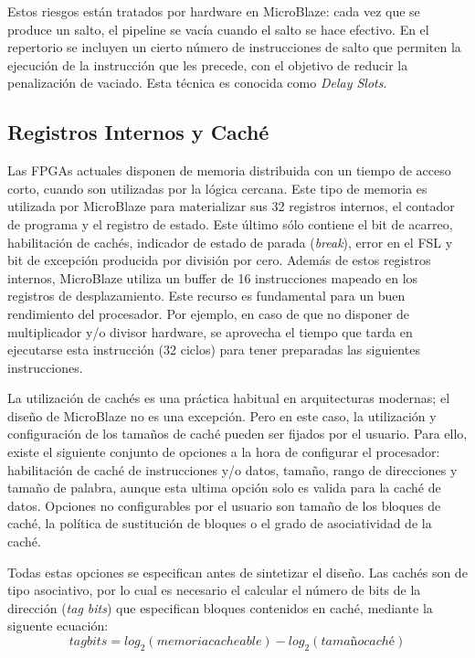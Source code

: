 Estos riesgos están tratados por hardware en MicroBlaze: cada vez que se produce
un salto, el pipeline se vacía cuando el salto se hace efectivo. En el
repertorio se incluyen un cierto número de instrucciones de salto que permiten
la ejecución de la instrucción que les precede, con el objetivo de reducir la
penalización de vaciado. Esta técnica es conocida como \emph{Delay Slots}.

\subsection{Registros Internos y Caché}

Las FPGAs actuales disponen de memoria distribuida con un tiempo de acceso
corto, cuando son utilizadas por la lógica cercana. Este tipo de memoria es
utilizada por MicroBlaze para materializar sus 32 registros internos, el
contador de programa y el registro de estado. Este último sólo contiene el bit
de acarreo, habilitación de cachés, indicador de estado de parada
(\emph{break}), error en el FSL y bit de excepción producida por división por
cero. Además de estos registros internos, MicroBlaze utiliza un buffer de 16
instrucciones mapeado en los registros de desplazamiento. Este recurso es
fundamental para un buen rendimiento del procesador. Por ejemplo, en caso de que
no disponer de multiplicador y/o divisor hardware, se aprovecha el tiempo que
tarda en ejecutarse esta instrucción (32 ciclos) para tener preparadas las
siguientes instrucciones.

La utilización de cachés es una práctica habitual en arquitecturas modernas; el
diseño de MicroBlaze no es una excepción. Pero en este caso, la utilización y
configuración de los tamaños de caché pueden ser fijados por el usuario. Para
ello, existe el siguiente conjunto de opciones a la hora de configurar el
procesador: habilitación de caché de instrucciones y/o datos, tamaño, rango de
direcciones y tamaño de palabra, aunque esta ultima opción solo es valida para
la caché de datos. Opciones no configurables por el usuario son tamaño
de los bloques de caché, la política de sustitución de bloques o el grado de
asociatividad de la caché.

Todas estas opciones se especifican antes de sintetizar el diseño. Las cachés
son de tipo asociativo, por lo cual es necesario el calcular el número de bits
de la dirección (\emph{tag bits}) que especifican bloques contenidos en caché,
mediante la siguente ecuación:
$$ tag bits = log_2(memoriacacheable) - log_2(tamañocaché) $$

